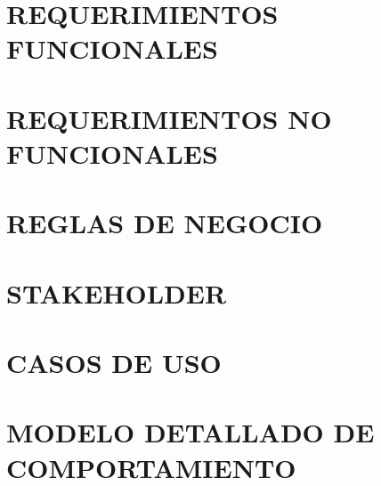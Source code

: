 \section{REQUERIMIENTOS FUNCIONALES}
	
\section{REQUERIMIENTOS NO FUNCIONALES}
	
\section{REGLAS DE NEGOCIO}
	
\section{STAKEHOLDER}
	
\section{CASOS DE USO}
	
\section{MODELO DETALLADO DE COMPORTAMIENTO}
	